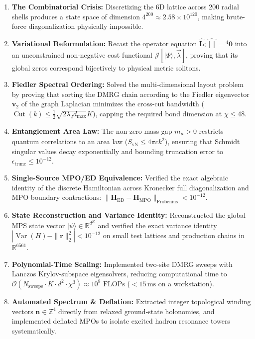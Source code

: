 \documentclass[
    12pt,
    a4paper,
    headings=normal,
    twoside=false,
    open=any,
    parskip=half
]{scrbook}
\begin{document}
\begin{tcolorbox}[colback=maincolor!3!white, colframe=maincolor!80!black, title={\textbf{Grand Synthesis of Chapter 4}}]
\begin{enumerate}[leftmargin=1.5em, itemsep=4pt]
    \item \textbf{The Combinatorial Crisis:} Discretizing the 6D lattice across 200 radial shells produces a state space of dimension $4^{200} \approx 2.58 \times 10^{120}$, making brute-force diagonalization physically impossible.
    \item \textbf{Variational Reformulation:} Recast the operator equation $\hat{\mathbf{L}} ; \hat{\mathbf{[]}} = {}^4\bar{\mathbf{0}}$ into an unconstrained non-negative cost functional $\mathcal{J}[|\Psi\rangle, \vec{\lambda}]$, proving that its global zeros correspond bijectively to physical metric solitons.
    \item \textbf{Fiedler Spectral Ordering:} Solved the multi-dimensional layout problem by proving that sorting the DMRG chain according to the Fiedler eigenvector $\mathbf{v}_2$ of the graph Laplacian minimizes the cross-cut bandwidth ($\operatorname{Cut}(k) \le \frac{1}{2}\sqrt{2\lambda_2 d_{\max}} K$), capping the required bond dimension at $\chi \le 48$.
    \item \textbf{Entanglement Area Law:} The non-zero mass gap $m_\mu > 0$ restricts quantum correlations to an area law ($S_{\text{vN}} \le 4\pi c k^2$), ensuring that Schmidt singular values decay exponentially and bounding truncation error to $\epsilon_{\text{trunc}} \le 10^{-12}$.
    \item \textbf{Single-Source MPO/ED Equivalence:} Verified the exact algebraic identity of the discrete Hamiltonian across Kronecker full diagonalization and MPO boundary contractions: $\|\mathbf{H}_{\text{ED}} - \mathbf{H}_{\text{MPO}}\|_{\text{Frobenius}} < 10^{-12}$.
    \item \textbf{State Reconstruction and Variance Identity:} Reconstructed the global MPS state vector $|\psi\rangle \in \mathbb{R}^{d^K}$ and verified the exact variance identity $|\operatorname{Var}(H) - \|\mathbf{r}\|_2^2| < 10^{-12}$ on small test lattices and production chains in $\mathbb{R}^{6561}$.
    \item \textbf{Polynomial-Time Scaling:} Implemented two-site DMRG sweeps with Lanczos Krylov-subspace eigensolvers, reducing computational time to $\mathcal{O}(N_{\text{sweeps}} \cdot K \cdot d^2 \cdot \chi^3) \approx 10^8\text{ FLOPs}$ ($< 15\,\text{ms}$ on a workstation).
    \item \textbf{Automated Spectrum \& Deflation:} Extracted integer topological winding vectors $\mathbf{n} \in \mathbb{Z}^4$ directly from relaxed ground-state holonomies, and implemented deflated MPOs to isolate excited hadron resonance towers systematically.
\end{enumerate}
\end{tcolorbox}
\end{document}
